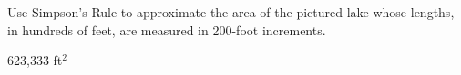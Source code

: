 {Use Simpson's Rule to approximate the area of the pictured lake whose lengths, in hundreds of feet, are measured in 200-foot increments.\label{07_01_ex_30}

\begin{center}\end{center}}
{623,333 ft$^2$}
